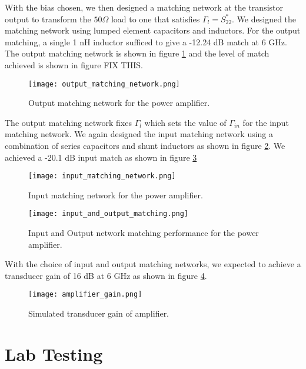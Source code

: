 \documentclass{article}
\begin{document}
With the bias chosen, we then designed a matching network at the transistor output to transform the $50 \Omega$ load to one that satisfies $\Gamma_l = S_{22}^*$. We designed the matching network using lumped element capacitors and inductors. For the output matching, a single 1 nH inductor sufficed to give a -12.24 dB match at 6 GHz. The output matching network is shown in figure \ref{fig:outputmatch} and the level of match achieved is shown in figure FIX THIS.


\begin{figure}[!htbp]
    \centering
    \texttt{[image: output\_matching\_network.png]}
    \caption{Output matching network for the power amplifier.}
    \label{fig:outputmatch}
\end{figure}


The output matching network fixes $\Gamma_l$ which sets the value of $\Gamma_{in}$ for the input matching network. We again designed the input matching network using a combination of series capacitors and shunt inductors as shown in figure \ref{fig:inputmatch}. We achieved a -20.1 dB input match as shown in figure \ref{fig:inputoutputmatching}

\begin{figure}[!htbp]
    \centering
    \texttt{[image: input\_matching\_network.png]}
    \caption{Input matching network for the power amplifier.}
    \label{fig:inputmatch}
\end{figure}



\begin{figure}[!htbp]
    \centering
    \texttt{[image: input\_and\_output\_matching.png]}
    \caption{Input and Output network matching performance for the power amplifier.}
    \label{fig:inputoutputmatching}
\end{figure}

With the choice of input and output matching networks, we expected to achieve a transducer gain of 16 dB at 6 GHz as shown in figure \ref{fig:ampgain}.

\begin{figure}[!htbp]
    \centering
    \texttt{[image: amplifier\_gain.png]}
    \caption{Simulated transducer gain of amplifier.}
    \label{fig:ampgain}
\end{figure}

\section*{Lab Testing}\label{sec:testing}
\end{document}
